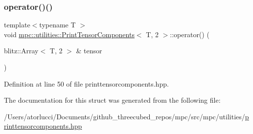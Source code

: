 \subsubsection{\texorpdfstring{operator()()}{operator()()}}
{\footnotesize\ttfamily template$<$typename T $>$ \\
void \mbox{\hyperlink{structmpc_1_1utilities_1_1_print_tensor_components}{mpc\+::utilities\+::\+Print\+Tensor\+Components}}$<$ T, 2 $>$\+::operator() (\begin{DoxyParamCaption}\item[{blitz\+::\+Array$<$ T, 2 $>$ \&}]{tensor }\end{DoxyParamCaption})\hspace{0.3cm}{\ttfamily [inline]}}



Definition at line 50 of file printtensorcomponents.\+hpp.



The documentation for this struct was generated from the following file\+:\begin{DoxyCompactItemize}
\item 
/\+Users/atorlucci/\+Documents/github\+\_\+threecubed\+\_\+repos/mpc/src/mpc/utilities/\mbox{\hyperlink{printtensorcomponents_8hpp}{printtensorcomponents.\+hpp}}\end{DoxyCompactItemize}
